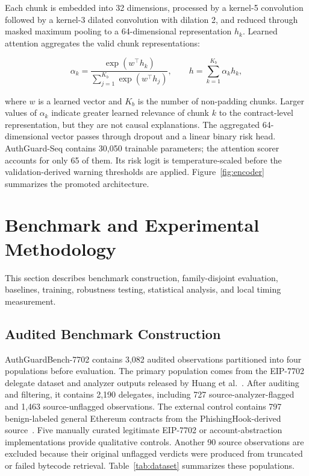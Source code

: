 \documentclass[conference]{IEEEtran}
\begin{document}
Each chunk is embedded into 32 dimensions, processed by a kernel-5 convolution followed by a kernel-3 dilated convolution with dilation 2, and reduced through masked maximum pooling to a 64-dimensional representation $h_k$. Learned attention aggregates the valid chunk representations:

\begin{equation}
\alpha_k=\frac{\exp(w^\top h_k)}{\sum_{j=1}^{K_b}\exp(w^\top h_j)},
\qquad
h=\sum_{k=1}^{K_b}\alpha_k h_k,
\label{eq:attention}
\end{equation}


where $w$ is a learned vector and $K_b$ is the number of non-padding chunks. Larger values of $\alpha_k$ indicate greater learned relevance of chunk $k$ to the contract-level representation, but they are not causal explanations. The aggregated 64-dimensional vector passes through dropout and a linear binary risk head. AuthGuard-Seq contains 30,050 trainable parameters; the attention scorer accounts for only 65 of them. Its risk logit is temperature-scaled before the validation-derived warning thresholds are applied. Figure~\ref{fig:encoder} summarizes the promoted architecture.




\section{Benchmark and Experimental Methodology}
\label{sec:method}
This section describes benchmark construction, family-disjoint evaluation, baselines, training, robustness testing, statistical analysis, and local timing measurement.

\subsection{Audited Benchmark Construction}

AuthGuardBench-7702 contains 3,082 audited observations partitioned into four populations before evaluation. The primary population comes from the EIP-7702 delegate dataset and analyzer outputs released by Huang et al.~\cite{huang2026darkside}. After auditing and filtering, it contains 2,190 delegates, including 727 source-analyzer-flagged and 1,463 source-unflagged observations. The external control contains 797 benign-labeled general Ethereum contracts from the PhishingHook-derived source~\cite{phishinghook2025}. Five manually curated legitimate EIP-7702 or account-abstraction implementations provide qualitative controls. Another 90 source observations are excluded because their original unflagged verdicts were produced from truncated or failed bytecode retrieval. Table~\ref{tab:dataset} summarizes these populations.
\end{document}
